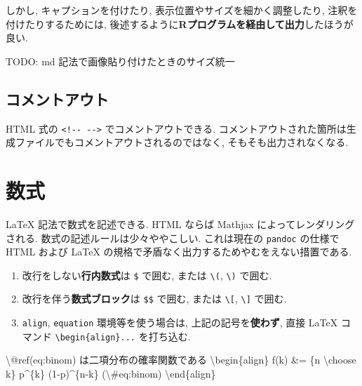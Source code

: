 \documentclass[
  xelatex,ja=standard,jafont=noto]{bxjsbook}
\newenvironment{Shaded}{\begin{snugshade}}{\end{snugshade}}
\newcommand{\NormalTok}[1]{#1}
\newcommand{\SpecialCharTok}[1]{\textcolor[rgb]{0.00,0.00,0.00}{#1}}
\providecommand{\tightlist}{%
  \setlength{\itemsep}{0pt}\setlength{\parskip}{0pt}}
\theoremstyle{definition}
\theoremstyle{definition}
\theoremstyle{definition}
\theoremstyle{definition}
\theoremstyle{remark}
\begin{document}
しかし, キャプションを付けたり, 表示位置やサイズを細かく調整したり,
注釈を付けたりするためには,
後述するように\textbf{Rプログラムを経由して出力}したほうが良い.

TODO: md 記法で画像貼り付けたときのサイズ統一

\hypertarget{ux30b3ux30e1ux30f3ux30c8ux30a2ux30a6ux30c8}{%
\subsection{コメントアウト}\label{ux30b3ux30e1ux30f3ux30c8ux30a2ux30a6ux30c8}}

HTML 式の \texttt{\textless{}!-\/-\ -\/-\textgreater{}}
でコメントアウトできる.
コメントアウトされた箇所は生成ファイルでもコメントアウトされるのではなく,
そもそも出力されなくなる.

\hypertarget{ux6570ux5f0f}{%
\section{数式}\label{ux6570ux5f0f}}

LaTeX 記法で数式を記述できる. HTML ならば Mathjax
によってレンダリングされる. 数式の記述ルールは少々ややこしい.
これは現在の \texttt{pandoc} の仕様で HTML および LaTeX
の規格で矛盾なく出力するためやむをえない措置である.

\begin{enumerate}
\def\labelenumi{\arabic{enumi}.}
\tightlist
\item
  改行をしない\textbf{行内数式}は \texttt{\$} で囲む, または
  \texttt{\textbackslash{}(}, \texttt{\textbackslash{})} で囲む.
\item
  改行を伴う\textbf{数式ブロック}は \texttt{\$\$} で囲む, または
  \texttt{\textbackslash{}{[}}, \texttt{\textbackslash{}{]}} で囲む.
\item
  \texttt{align}, \texttt{equation} 環境等を使う場合は,
  上記の記号を\textbf{使わず}, 直接 LaTeX コマンド
  \texttt{\textbackslash{}begin\{align\}...} を打ち込む.
\end{enumerate}

\begin{Shaded}
\begin{Highlighting}[]
\NormalTok{\textbackslash{}@ref(eq:binom) は二項分布の確率関数である}
\NormalTok{\textbackslash{}begin\{align\}}
\NormalTok{f(k) \&= \{n \textbackslash{}choose k\} p\^{}\{k\} (1{-}p)\^{}\{n{-}k\} (}\SpecialCharTok{\textbackslash{}\#}\NormalTok{eq:binom)}
\NormalTok{\textbackslash{}end\{align\}}
\end{Highlighting}
\end{Shaded}
\end{document}
